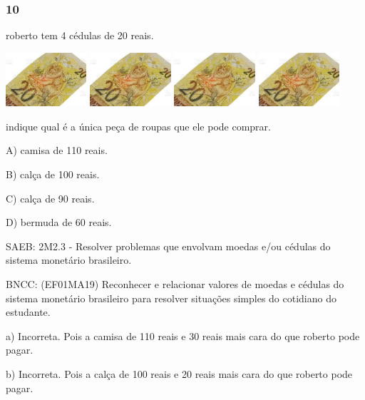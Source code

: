 \subsubsection{10 }\label{section-126}

roberto tem 4 cédulas de 20 reais.

\includegraphics[width=1.18253in,height=0.78643in]{media/image108.jpg}
\includegraphics[width=1.18253in,height=0.78643in]{media/image108.jpg}
\includegraphics[width=1.18253in,height=0.78643in]{media/image108.jpg}
\includegraphics[width=1.18253in,height=0.78643in]{media/image108.jpg}

indique qual é a única peça de roupas que ele pode comprar.

A) camisa de 110 reais.

B) calça de 100 reais.

C) calça de 90 reais.

D) bermuda de 60 reais.

SAEB: 2M2.3 - Resolver problemas que envolvam moedas e/ou cédulas do
sistema monetário brasileiro.

BNCC: (EF01MA19) Reconhecer e relacionar valores de moedas e cédulas do
sistema monetário brasileiro para resolver situações simples do
cotidiano do estudante.

a) Incorreta. Pois a camisa de 110 reais e 30 reais mais cara do que
roberto pode pagar.

b) Incorreta. Pois a calça de 100 reais e 20 reais mais cara do que
roberto pode pagar.

